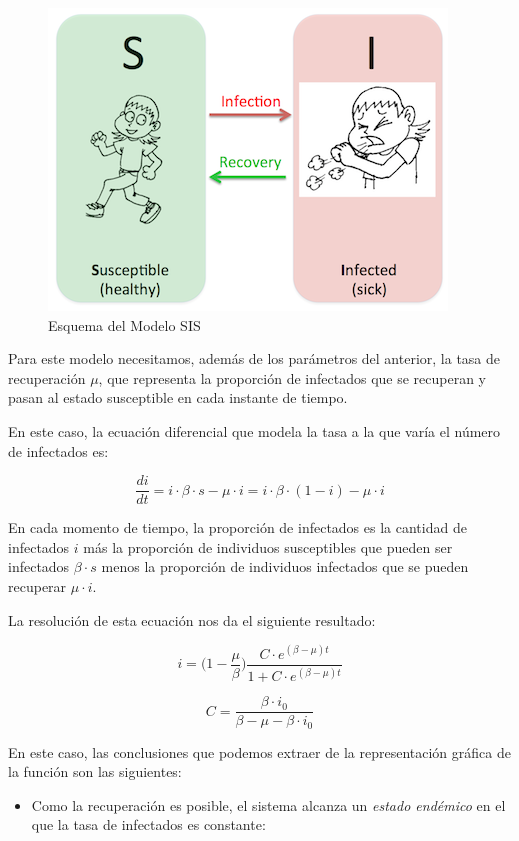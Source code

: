 \documentclass[]{article}
\begin{document}
\begin{figure}[htbp]
\centering
\includegraphics{../images/tema08/modeloSIS.png}
\caption{Esquema del Modelo SIS}
\end{figure}

Para este modelo necesitamos, además de los parámetros del anterior, la
tasa de recuperación \(\mu\), que representa la proporción de infectados
que se recuperan y pasan al estado susceptible en cada instante de
tiempo.

En este caso, la ecuación diferencial que modela la tasa a la que varía
el número de infectados es:

\[\frac{di}{dt} = i \cdot \beta  \cdot s - \mu \cdot i=  i \cdot \beta \cdot (1-i) - \mu \cdot i\]

En cada momento de tiempo, la proporción de infectados es la cantidad de
infectados \(i\) más la proporción de individuos susceptibles que pueden
ser infectados \(\beta \cdot s\) menos la proporción de individuos
infectados que se pueden recuperar \(\mu \cdot i\).

La resolución de esta ecuación nos da el siguiente resultado:

\[i = \Big(1- \frac{\mu}{\beta}\Big) \frac{C \cdot e^{(\beta - \mu)t}}{1 + C \cdot e ^{(\beta -\mu)t}}\]

\[C= \frac{\beta \cdot i_0}{\beta - \mu - \beta \cdot i_0}\]

En este caso, las conclusiones que podemos extraer de la representación
gráfica de la función son las siguientes:

\begin{itemize}
\itemsep1pt\parskip0pt
\item
  Como la recuperación es posible, el sistema alcanza un \emph{estado
  endémico} en el que la tasa de infectados es constante:
\end{itemize}
\end{document}
